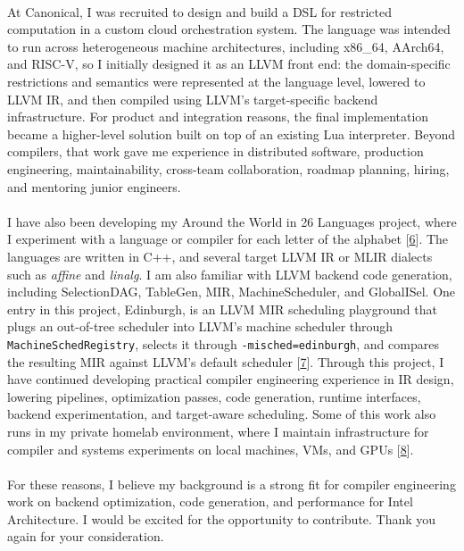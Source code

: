 \paragraph{} %
At Canonical, I was recruited to design and build a DSL for restricted computation in a custom cloud orchestration system. The language was intended to run across heterogeneous machine architectures, including x86\_64, AArch64, and RISC-V, so I initially designed it as an LLVM front end: the domain-specific restrictions and semantics were represented at the language level, lowered to LLVM IR, and then compiled using LLVM's target-specific backend infrastructure. For product and integration reasons, the final implementation became a higher-level solution built on top of an existing Lua interpreter. Beyond compilers, that work gave me experience in distributed software, production engineering, maintainability, cross-team collaboration, roadmap planning, hiring, and mentoring junior engineers.

\paragraph{} %
I have also been developing my Around the World in 26 Languages project, where I experiment with a language or compiler for each letter of the alphabet [\href{\atwurl}{6}]. The languages are written in C++, and several target LLVM IR or MLIR dialects such as \emph{affine} and \emph{linalg}. I am also familiar with LLVM backend code generation, including SelectionDAG, TableGen, MIR, MachineScheduler, and GlobalISel. One entry in this project, Edinburgh, is an LLVM MIR scheduling playground that plugs an out-of-tree scheduler into LLVM's machine scheduler through \texttt{MachineSchedRegistry}, selects it through \texttt{-misched=edinburgh}, and compares the resulting MIR against LLVM's default scheduler [\href{\edinburghurl}{7}]. Through this project, I have continued developing practical compiler engineering experience in IR design, lowering pipelines, optimization passes, code generation, runtime interfaces, backend experimentation, and target-aware scheduling. Some of this work also runs in my private homelab environment, where I maintain infrastructure for compiler and systems experiments on local machines, VMs, and GPUs [\href{\homelaburl}{8}].



\paragraph{} %
For these reasons, I believe my background is a strong fit for compiler engineering work on backend optimization, code generation, and performance for Intel Architecture. I would be excited for the opportunity to contribute. Thank you again for your consideration.

